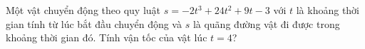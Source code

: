 \begin{bt}[0,5 điểm]%
	Một vật chuyển động theo quy luật $s=-2t^3+24t^2+9t-3$ với $t$ là khoảng thời gian tính từ lúc bắt đầu chuyển động và $s$ là quãng đường vật đi được trong khoảng thời gian đó. Tính vận tốc của vật lúc $t=4$?
\end{bt}


